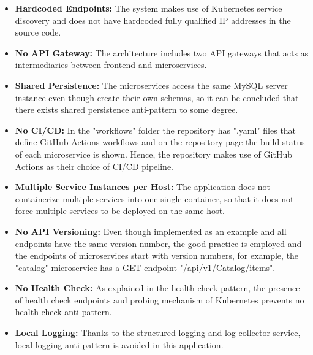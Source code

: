 \documentclass{Configuration_Files/PoliMi3i_thesis}
\begin{document}
\begin{itemize}
    \item \textbf{Hardcoded Endpoints:} The system makes use of Kubernetes service discovery and does not have hardcoded fully qualified IP addresses in the source code.
    
    \item \textbf{No API Gateway:} The architecture includes two API gateways that acts as intermediaries between frontend and microservices.
    
    \item \textbf{Shared Persistence:} The microservices access the same MySQL server instance even though create their own schemas, so it can be concluded that there exists shared persistence anti-pattern to some degree.
    
    \item \textbf{No CI/CD:} In the "workflows" folder the repository has ".yaml" files that define GitHub Actions\footnotemark[71] workflows and on the repository page the build status of each microservice is shown.
    Hence, the repository makes use of GitHub Actions as their choice of CI/CD pipeline.
    
    \item \textbf{Multiple Service Instances per Host:} The application does not containerize multiple services into one single container, so that it does not force multiple services to be deployed on the same host.
    
    \item \textbf{No API Versioning:} Even though implemented as an example and all endpoints have the same version number, the good practice is employed and the endpoints of microservices start with version numbers, for example, the "catalog" microservice has a GET endpoint "/api/v1/Catalog/items".
    
    \item \textbf{No Health Check:} As explained in the health check pattern, the presence of health check endpoints and probing mechanism of Kubernetes prevents no health check anti-pattern.
    
    \item \textbf{Local Logging:} Thanks to the structured logging and log collector service, local logging anti-pattern is avoided in this application.\\\\\\\\
\end{itemize}
\end{document}
